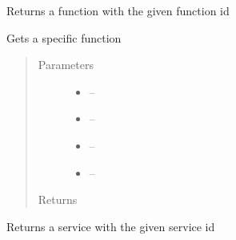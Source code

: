\documentclass[letterpaper,10pt,english]{sphinxmanual}
\begin{document}

\begin{fulllineitems}
\label{_source/son_editor.impl:son_editor.impl.catalogue_servicesimpl.get_function}
Returns a function with the given function id

\end{fulllineitems}


\begin{fulllineitems}
\label{_source/son_editor.impl:son_editor.impl.catalogue_servicesimpl.get_in_catalogue}
Gets a specific function
\begin{quote}\begin{description}
\item[{Parameters}] \leavevmode\begin{itemize}
\item {} 
 -- 

\item {} 
 -- 

\item {} 
 -- 

\item {} 
 -- 

\end{itemize}

\item[{Returns}] \leavevmode


\end{description}\end{quote}

\end{fulllineitems}


\begin{fulllineitems}
\label{_source/son_editor.impl:son_editor.impl.catalogue_servicesimpl.get_service}
Returns a service with the given service id

\end{fulllineitems}
\end{document}
